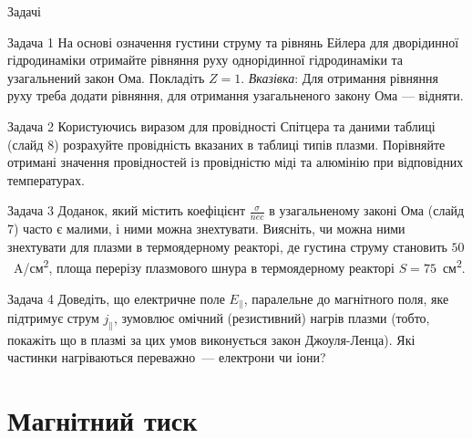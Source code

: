 \documentclass[]{beamer}
\begin{document}
\begin{frame}{Задачі}{}
	\begin{exampleblock}{Задача 1}\justifying\scriptsize
		На основі означення густини струму та рівнянь Ейлера для дворідинної гідродинаміки отримайте рівняння руху однорідинної гідродинаміки та узагальнений закон Ома. Покладіть $Z = 1$. \emph{Вказівка}: Для отримання рівняння руху треба додати рівняння, для отримання узагальненого закону Ома --- відняти.

	\end{exampleblock}

	\begin{exampleblock}{Задача 2}\justifying\scriptsize
		Користуючись виразом для провідності Спітцера та даними таблиці (слайд 8) розрахуйте
		провідність вказаних в таблиці типів плазми. Порівняйте отримані значення провідностей із
		провідністю міді та алюмінію при відповідних температурах.
	\end{exampleblock}

	\begin{exampleblock}{Задача 3}\justifying\scriptsize
		Доданок, який містить коефіцієнт $\frac\sigma{nec}$ в узагальненому законі Ома (слайд 7) часто є малими, і ними можна знехтувати. Виясніть, чи можна ними знехтувати для плазми в термоядерному реакторі, де густина струму становить $50$~A/см\textsuperscript{2}, площа перерізу плазмового шнура в термоядерному реакторі $S = 75$~см\textsuperscript{2}.
	\end{exampleblock}

	\begin{exampleblock}{Задача 4}\justifying\scriptsize
        Доведіть, що електричне поле $E_\parallel$, паралельне до магнітного
        поля, яке підтримує струм $j_\parallel$, зумовлює омічний (резистивний) нагрів
        плазми (тобто, покажіть що в плазмі за цих умов виконується закон Джоуля-Ленца). Які частинки нагріваються переважно~--- електрони чи іони?
	\end{exampleblock}

\end{frame}

\section{Магнітний тиск}
\end{document}
